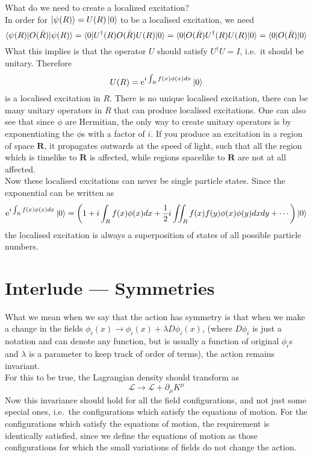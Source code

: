 \documentclass[11pt, notitlepage]{report}
\newcommand{\del}{\partial}
\newcommand{\e}{\mathrm{e}}
\newcommand{\ld}{\mathcal{L}}
\numberwithin{equation}{section}
\begin{document}
    What do we need to create a localized excitation?\\
    In order for \(\ket{\psi(R)} = U(R)\ket{0}\) to be a localised excitation, we need 
    \begin{equation*}
        \braket{\psi(R)|O(\bar{R})|\psi(R)} = \braket{0|U^\dagger(R)O(\bar{R})U(R)|0} = \braket{0|O(\bar{R})U^\dagger(R)U(R)|0} = \braket{0|O(\bar{R})|0}
    \end{equation*}
    What this implies is that the operator \(U\) should satisfy \(U^\dagger U = I\), i.e.\ it should be unitary. Therefore 
    \begin{equation*}
        U(R) = \e^{i\int_R f(x)\phi(x) dx}\ket{0}
    \end{equation*}
    is a localised excitation in \(R\). There is no unique localised excitation, there can be many unitary operators in \(R\) that can produce localised excitations. One can also see that since \(\phi\) are Hermitian, the only way to create unitary operators is by exponentiating the \(\phi\)s with a factor of \(i\). If you produce an excitation in a region of space \(\textbf{R}\), it propagates outwards at the speed of light, such that all the region which is timelike to \(\textbf{R}\) is affected, while regions spacelike to \(\textbf{R}\) are not at all affected. \\
    
    Now these localised excitations can never be single particle states. Since the exponential can be written as 
    \begin{equation*}
        \e^{i\int_R f(x)\phi(x) dx}\ket{0} = \left(1 + i\int_R f(x)\phi(x) dx + \frac{1}{2}i\iint_R f(x)f(y)\phi(x)\phi(y) dxdy + \cdots \right)\ket{0}
    \end{equation*}
    the localised excitation is always a superposition of states of all possible particle numbers. 

    \newpage
    \section{Interlude — Symmetries}

    What we mean when we say that the action has symmetry is that when we make a change in the fields \(\phi_i(x) \to \phi_i(x) + \lambda D\phi_i(x)\), (where \(D\phi_i\) is just a notation and can denote any function, but is usually a function of original \(\phi_i\)s and \(\lambda\) is a parameter to keep track of order of terms), the action remains invariant. \\
    For this to be true, the Lagrangian density should transform as 
    \begin{equation*}
        \ld \to \ld + \del_\mu K^\mu
    \end{equation*}
    Now this invariance should hold for all the field configurations, and not just some special ones, i.e.\ the configurations which satisfy the equations of motion. For the configurations which satisfy the equations of motion, the requirement is identically satisfied, since we define the equations of motion as those configurations for which the small variations of fields do not change the action.\\ 
\end{document}
